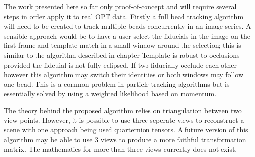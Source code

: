The work presented here so far only proof-of-concept and will require several steps in order apply it to real OPT data.
Firstly a full bead tracking algorithm will need to be created to track multiple beads concurrently in an image series.
A sensible approach would be to have a user select the fiducials in the image on the first frame and template match in a small window around the selection; this is similar to the algorithm described in chapter %
Template is robust to occlusions provided the fidcuial is not fully eclipsed.
If two fiducially occlude each other however this algorithm may switch their identities or both windows may follow one bead.
This is a common problem in particle tracking algorithms but is essentially solved by using a weighted likelihood based on momentum.

The theory behind the proposed algorithm relies on triangulation between two view points.
However, it is possible to use three seperate views to reconstruct a scene with one approach being used quarternion tensors.
A future version of this algorithm may be able to use 3 views to produce a more faithful transformation matrix.
The mathematics for more than three views currently does not exist.
